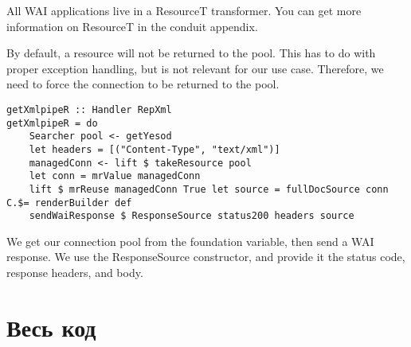 All WAI applications live in a ResourceT transformer. You can get more information on ResourceT in the conduit appendix.

By default, a resource will not be returned to the pool. This has to do with proper exception handling, but is not relevant for our use case. Therefore, we need to force the connection to be returned to the pool.

\begin{lstlisting}
getXmlpipeR :: Handler RepXml
getXmlpipeR = do
    Searcher pool <- getYesod
    let headers = [("Content-Type", "text/xml")]
    managedConn <- lift $ takeResource pool
    let conn = mrValue managedConn
    lift $ mrReuse managedConn True let source = fullDocSource conn C.$= renderBuilder def
    sendWaiResponse $ ResponseSource status200 headers source
\end{lstlisting}

We get our connection pool from the foundation variable, then send a WAI response. We use the ResponseSource constructor, and provide it the status code, response headers, and body.

\section{Весь код} %


